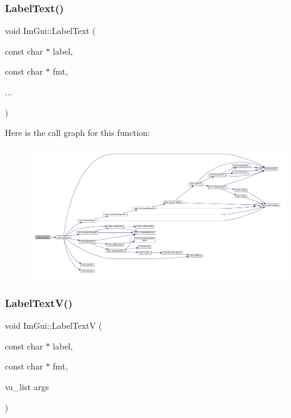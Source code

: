 \subsubsection{\texorpdfstring{Label\+Text()}{LabelText()}}
{\footnotesize\ttfamily void Im\+Gui\+::\+Label\+Text (\begin{DoxyParamCaption}\item[{const char $\ast$}]{label,  }\item[{const char $\ast$}]{fmt,  }\item[{}]{... }\end{DoxyParamCaption})}

Here is the call graph for this function\+:
\nopagebreak
\begin{figure}[H]
\begin{center}
\leavevmode
\includegraphics[width=350pt]{namespace_im_gui_ad92ccfbc33d448ff40cfcf9219177344_cgraph}
\end{center}
\end{figure}
\mbox{\label{namespace_im_gui_a55e5a7edb676a8f5cd7f65443138a8a0}} 
\subsubsection{\texorpdfstring{Label\+Text\+V()}{LabelTextV()}}
{\footnotesize\ttfamily void Im\+Gui\+::\+Label\+TextV (\begin{DoxyParamCaption}\item[{const char $\ast$}]{label,  }\item[{const char $\ast$}]{fmt,  }\item[{va\+\_\+list}]{args }\end{DoxyParamCaption})}

